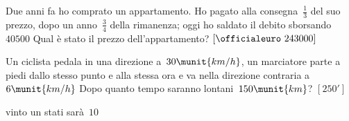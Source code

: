\begin{htmulticols}{2}
\begin{esercizio}[*]
\label{ese:14.63}
Due anni fa ho comprato un appartamento. Ho pagato alla 
consegna~\(\frac{1}{3}\) 
del suo prezzo, dopo un anno~\(\frac{3}{4}\) della rimanenza; oggi ho saldato 
il 
debito sborsando \officialeuro~\(40500\) Qual è stato il prezzo 
dell'appartamento?
 \hfill \(\left[\officialeuro~243000\right]\)
\end{esercizio}

\begin{esercizio}[*]
\label{ese:14.64}
Un ciclista pedala in una direzione a~\(30\munit{km/h}\), un marciatore parte a 
piedi dallo stesso punto e alla stessa ora e va nella direzione contraria 
a~\(6\munit{km/h}\) Dopo quanto tempo saranno lontani~\(150\munit{km}\)?
 \hfill \(\left[250'\right]\)
\end{esercizio}

% 
vinto un 
stati 
% 
% 
sarà~\(10\) 


\end{htmulticols}

